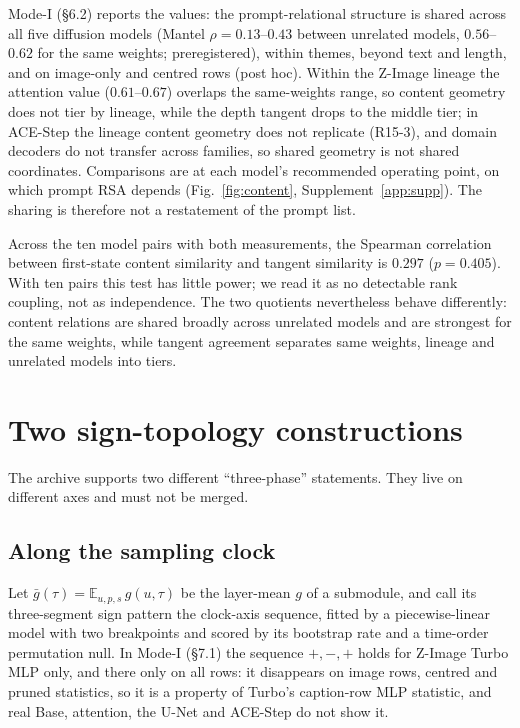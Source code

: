 \documentclass[11pt]{article}
\theoremstyle{definition}
\newcommand{\E}{\mathbb{E}}
\begin{document}
Mode-I (\S6.2) reports the values: the prompt-relational structure is shared across all five diffusion models (Mantel $\rho=0.13$--$0.43$ between unrelated models, $0.56$--$0.62$ for the same weights; preregistered), within themes, beyond text and length, and on image-only and centred rows (post hoc). Within the Z-Image lineage the attention value ($0.61$--$0.67$) overlaps the same-weights range, so content geometry does not tier by lineage, while the depth tangent drops to the middle tier; in ACE-Step the lineage content geometry does not replicate (R15-3), and domain decoders do not transfer across families, so shared geometry is not shared coordinates. Comparisons are at each model's recommended operating point, on which prompt RSA depends (Fig.~\ref{fig:content}, Supplement~\ref{app:supp}). The sharing is therefore not a restatement of the prompt list.

Across the ten model pairs with both measurements, the Spearman correlation between first-state content similarity and tangent similarity is $0.297$ ($p=0.405$). With ten pairs this test has little power; we read it as no detectable rank coupling, not as independence. The two quotients nevertheless behave differently: content relations are shared broadly across unrelated models and are strongest for the same weights, while tangent agreement separates same weights, lineage and unrelated models into tiers.



\section{Two sign-topology constructions}\label{sec:topology}

The archive supports two different ``three-phase'' statements. They live on different axes and must not be merged.

\subsection{Along the sampling clock}
Let $\bar g(\tau)=\E_{u,p,s}\,g(u,\tau)$ be the layer-mean $g$ of a submodule, and call its three-segment sign pattern the clock-axis sequence, fitted by a piecewise-linear model with two breakpoints and scored by its bootstrap rate and a time-order permutation null. In Mode-I (\S7.1) the sequence $+,-,+$ holds for Z-Image Turbo MLP only, and there only on all rows: it disappears on image rows, centred and pruned statistics, so it is a property of Turbo's caption-row MLP statistic, and real Base, attention, the U-Net and ACE-Step do not show it.
\end{document}
